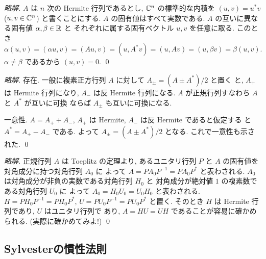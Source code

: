 \documentclass[12pt,twoside]{jarticle}
\begin{document}

\begin{proof}[\protect{[152]}略解]
  $A$ は $n$ 次の Hermite 行列であるとし, 
  ${\mathbb C}^n$ の標準的な内積を $(u,v)=u^*v$ ($u,v\in{\mathbb C}^n$) と書くことにする.
  $A$ の固有値はすべて実数である.
  $A$ の互いに異なる固有値 $\alpha,\beta\in{\mathbb R}$ と
  それぞれに属する固有ベクトル $u,v$ を任意に取る.
  このとき
  \begin{equation*}
    \alpha(u,v)=(\alpha u,v)=(Au,v)=(u,A^*v)=(u,Av)=(u,\beta v)=\beta(u,v).
  \end{equation*}
  $\alpha\ne\beta$ であるから $(u,v)=0$. \qed
\end{proof}


\begin{proof}[\protect{[153]}略解]
  存在.
  一般に複素正方行列 $A$ に対して $A_{\pm}=(A\pm A^*)/2$ と置く
  と, $A_+$ は Hermite 行列になり, $A_-$ は反 Hermite 行列になる. 
  $A$ が正規行列すなわち $A$ と $A^*$ が互いに可換
  ならば $A_\pm$ も互いに可換になる.

  一意性.
  $A=A_++A_-$, $A_+$ は Hermite, $A_-$ は反 Hermite であると仮定する
  と $A^*=A_+-A_-$ である. よって $A_\pm=(A\pm A^*)/2$ となる.
  これで一意性も示された.
  \qed
\end{proof}


\begin{proof}[\protect{[154]}略解]
  正規行列 $A$ は Toeplitz の定理より, あるユニタリ行列 $P$ 
  と $A$ の固有値を対角成分に持つ対角行列 $A_0$ に
  よって $A=PA_0P^{-1}=PA_0P^*$ と表わされる.
  $A_0$ は対角成分が非負の実数である対角行列 $H_0$ と
  対角成分が絶対値 $1$ の複素数である対角行列 $U_0$ に
  よって $A_0=H_0U_0=U_0H_0$ と表わされる.
  $H=PH_0P^{-1}=PH_0P^*$, $U=PU_0P^{-1}=PU_0P^*$ と置く. 
  そのとき $H$ は Hermite 行列であり, $U$ はユニタリ行列で
  あり, $A=HU=UH$ であることが容易に確かめられる.
  (実際に確かめてみよ!)
  \qed
\end{proof}


\subsection{Sylvesterの慣性法則}
\end{document}
